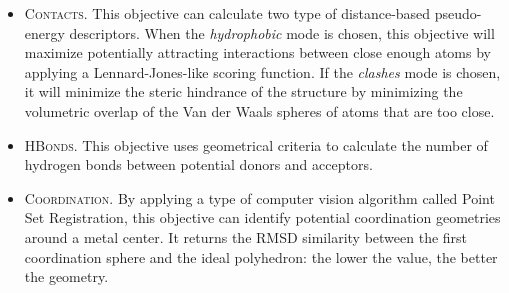 \begin{itemize}
	\item \textsc{Contacts}. This objective can calculate two type of distance-based pseudo-energy descriptors. When the \textit{hydrophobic} mode is chosen, this objective will maximize potentially attracting interactions between close enough atoms by applying a Lennard-Jones-like scoring function. If the \textit{clashes} mode is chosen, it will minimize the steric hindrance of the structure by minimizing the volumetric overlap of the Van der Waals spheres of atoms that are too close.

	\item \textsc{HBonds}. This objective uses geometrical criteria to calculate the number of hydrogen bonds between potential donors and acceptors.

	\item \textsc{Coordination}. By applying a type of computer vision algorithm called Point Set Registration, this objective can identify potential coordination geometries around a metal center. It returns the RMSD similarity between the first coordination sphere and the ideal polyhedron: the lower the value, the better the geometry.
\end{itemize}


